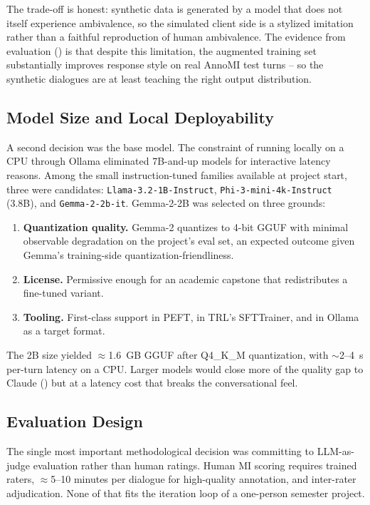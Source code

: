 The trade-off is honest: synthetic data is generated by a model that does not
itself experience ambivalence, so the simulated client side is a stylized
imitation rather than a faithful reproduction of human ambivalence. The
evidence from evaluation () is that despite this limitation,
the augmented training set substantially improves response style on real
AnnoMI test turns -- so the synthetic dialogues are at least teaching the
right output distribution.

\subsection{Model Size and Local Deployability}

A second decision was the base model. The constraint of running locally on
a CPU through Ollama eliminated 7B-and-up models for interactive latency
reasons. Among the small instruction-tuned families available at project
start, three were candidates: \texttt{Llama-3.2-1B-Instruct},
\texttt{Phi-3-mini-4k-Instruct} (3.8B), and \texttt{Gemma-2-2b-it}.
Gemma-2-2B was selected on three grounds:
\begin{enumerate}
    \item \textbf{Quantization quality.} Gemma-2 quantizes to 4-bit GGUF with
    minimal observable degradation on the project's eval set, an expected
    outcome given Gemma's training-side quantization-friendliness.
    \item \textbf{License.} Permissive enough for an academic capstone that
    redistributes a fine-tuned variant.
    \item \textbf{Tooling.} First-class support in PEFT, in TRL's SFTTrainer,
    and in Ollama as a target format.
\end{enumerate}

The 2B size yielded $\approx$1.6~GB GGUF after Q4\_K\_M quantization, with
$\sim$2--4~s per-turn latency on a CPU. Larger models would close more of the
quality gap to Claude () but at a latency cost that breaks
the conversational feel.

\subsection{Evaluation Design}

The single most important methodological decision was committing to LLM-as-judge
evaluation rather than human ratings. Human MI scoring requires trained raters,
$\approx$5--10 minutes per dialogue for high-quality annotation, and inter-rater
adjudication. None of that fits the iteration loop of a one-person semester
project.

